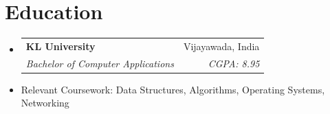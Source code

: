 \documentclass[letterpaper,11pt]{article}
\makeatletter
\newcommand{\resumeItem}[1]{
  \item\small{
    {#1 \vspace{-2pt}}
  }
}
\newcommand{\resumeSubheading}[4]{
  \vspace{-2pt}\item
    \begin{tabular*}{0.97\textwidth}[t]{l@{\extracolsep{\fill}}r}
      \textbf{#1} & #2 \\
      \textit{\small#3} & \textit{\small #4} \\
    \end{tabular*}\vspace{-7pt}
}
\newcommand{\resumeSubHeadingListStart}{\begin{itemize}[leftmargin=0.15in, label={}]}
\newcommand{\resumeSubHeadingListEnd}{\end{itemize}}
\makeatother
\begin{document}
\section{Education}
  \resumeSubHeadingListStart
    \resumeSubheading
      {KL University}{Vijayawada, India}
      {Bachelor of Computer Applications}{CGPA: 8.95}
      \resumeItem{Relevant Coursework: Data Structures, Algorithms, Operating Systems, Networking}
  \resumeSubHeadingListEnd


\end{document}
